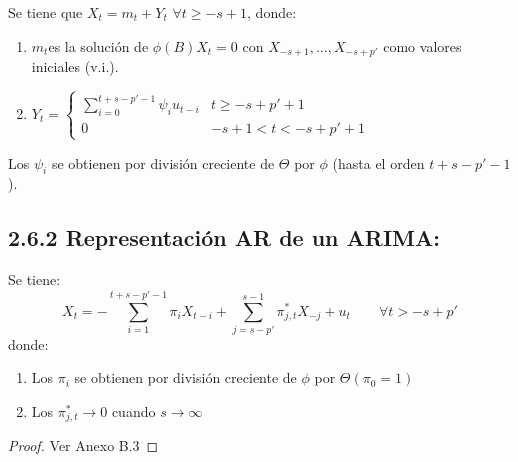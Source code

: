 \begin{teorema}
 Se tiene 
que $X_{t}= m_{t}+Y_{t}$ $\forall t\ge -s+1$, donde: 
\begin{enumerate}
\item $m_{t} $es la soluci\'{o}n de $\phi (B)X_{t} =0$ con $X_{-s+1} ,\ldots,X_{-s+p'} $ como valores iniciales (v.i.).
\item $Y_{t} =\begin{cases}\displaystyle
               \sum_{i=0}^{t+s-p'-1} \psi_{i} u_{t-i} & t\ge -s+p'+1 \\ 
               0 & -s+1<t<-s+p'+1
              \end{cases}$
\end{enumerate}
Los $\psi_{i} $ se obtienen por divisi\'{o}n creciente de $\Theta $ por 
$\phi $ (hasta el orden $t+s-p'-1$).
\end{teorema}



\subsection{2.6.2 Representaci\'{o}n AR de un ARIMA:}

\begin{teorema}
 Se tiene:
\[
X_{t} =-\sum_{i=1}^{t+s-p'-1} {\pi_{i} X_{t-i} +} 
\sum_{j=s-p'}^{s-1} {\pi_{j,t}^{\ast } X_{-j} +u_{t} } 
\qquad
\forall t>-s+p'
\]
donde:
\begin{enumerate}
\item Los $\pi_{i} $ se obtienen por divisi\'{o}n creciente de $\phi $ por $\Theta (\pi_{0} =1)$
\item Los $\pi_{j,t}^{\ast } \to 0$ cuando $s\to \infty $
\end{enumerate}
\end{teorema}

\begin{proof}
 Ver Anexo B.3
\end{proof}


